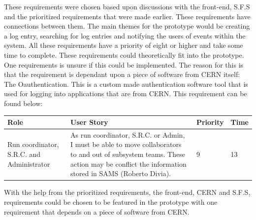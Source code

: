 \documentclass[paper=a4, fontsize=11pt,twoside]{scrartcl}	%
\begin{document}
These requirements were chosen based upon discussions with the front-end, S.F.S and the prioritized requirements that were made earlier. These requirements have connections between them. The main themes for the prototype would be creating a log entry, searching for log entries and notifying the users of events within the system. All these requirements have a priority of eight or higher and take some time to complete. These requirements could theoretically fit into the prototype. One requirements is unsure if this could be implemented. The reason for this is that the requirement is dependant upon a piece of software from CERN itself: The Oauthentication. This is a custom made authentication software tool that is used for logging into applications that are from CERN. This requirement can be found below: \\

\begin{longtable}{ | p{3cm} | p{8cm} | p{1.5cm} | l |}
\hline
Role & User Story & Priority & Time \\ \hline
Run coordinator, S.R.C. and Administrator &  As run coordinator, S.R.C. or Admin, I must be able to move collaborators to and out of subsystem teams. These action may be conflict the information stored in SAMS (Roberto Divia). & 9 & 13 \\ \hline
\end{longtable}

With the help from the prioritized requirements, the front-end, CERN and S.F.S, requirements could be chosen to be featured in the prototype with one requirement that depends on a piece of software from CERN.
\newpage
\end{document}
